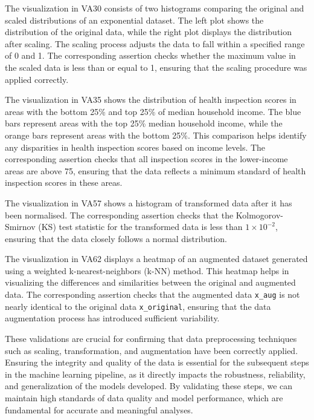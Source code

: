 The visualization in VA30 consists of two histograms comparing the original and scaled distributions of an exponential dataset. The left plot shows the distribution of the original data, while the right plot displays the distribution after scaling. The scaling process adjusts the data to fall within a specified range of 0 and 1. The corresponding assertion checks whether the maximum value in the scaled data is less than or equal to 1, ensuring that the scaling procedure was applied correctly.

The visualization in VA35 shows the distribution of health inspection scores in areas with the bottom 25\% and top 25\% of median household income. The blue bars represent areas with the top 25\% median household income, while the orange bars represent areas with the bottom 25\%. This comparison helps identify any disparities in health inspection scores based on income levels. The corresponding assertion checks that all inspection scores in the lower-income areas are above 75, ensuring that the data reflects a minimum standard of health inspection scores in these areas.

The visualization in VA57 shows a histogram of transformed data after it has been normalised. The corresponding assertion checks that the Kolmogorov-Smirnov (KS) test statistic for the transformed data is less than $1 \times 10^{-2}$, ensuring that the data closely follows a normal distribution.

The visualization in VA62 displays a heatmap of an augmented dataset generated using a weighted k-nearest-neighbors (k-NN) method. This heatmap helps in visualizing the differences and similarities between the original and augmented data. The corresponding assertion checks that the augmented data \lstinline{x_aug} is not nearly identical to the original data \lstinline{x_original}, ensuring that the data augmentation process has introduced sufficient variability.

These validations are crucial for confirming that data preprocessing techniques such as scaling, transformation, and augmentation have been correctly applied. Ensuring the integrity and quality of the data is essential for the subsequent steps in the machine learning pipeline, as it directly impacts the robustness, reliability, and generalization of the models developed. By validating these steps, we can maintain high standards of data quality and model performance, which are fundamental for accurate and meaningful analyses.


